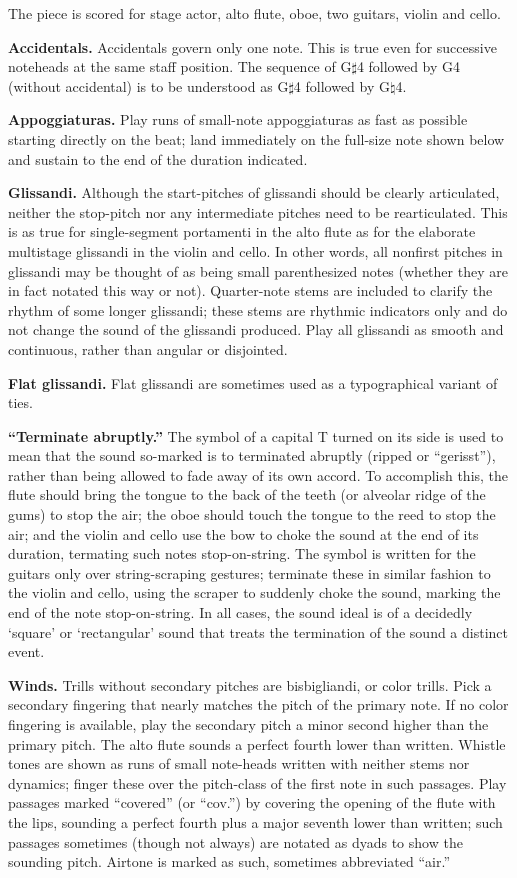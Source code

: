 The piece is scored for stage actor, alto flute, oboe, two guitars, violin and
cello.

\textbf{Accidentals.} Accidentals govern only one note. This is true even for
successive noteheads at the same staff position. The sequence of G$\sharp$4
followed by G4 (without accidental) is to be understood as G$\sharp$4 followed
by G$\natural$4.

\textbf{Appoggiaturas.} Play runs of small-note appoggiaturas as fast as
possible starting directly on the beat; land immediately on the full-size note
shown below and sustain to the end of the duration indicated.

\textbf{Glissandi.} Although the start-pitches of glissandi should be clearly
articulated, neither the stop-pitch nor any intermediate pitches need to be
rearticulated. This is as true for single-segment portamenti in the alto flute
as for the elaborate multistage glissandi in the violin and cello. In other
words, all nonfirst pitches in glissandi may be thought of as being small
parenthesized notes (whether they are in fact notated this way or not).
Quarter-note stems are included to clarify the rhythm of some longer glissandi;
these stems are rhythmic indicators only and do not change the sound of the
glissandi produced. Play all glissandi as smooth and continuous, rather than
angular or disjointed.

\textbf{Flat glissandi.} Flat glissandi are sometimes used as a typographical
variant of ties.

\textbf{``Terminate abruptly.''} The symbol of a capital T turned on its side
is used to mean that the sound so-marked is to terminated abruptly (ripped or
``gerisst''), rather than being allowed to fade away of its own accord. To
accomplish this, the flute should bring the tongue to the back of the teeth (or
alveolar ridge of the gums) to stop the air; the oboe should touch the tongue
to the reed to stop the air; and the violin and cello use the bow to choke the
sound at the end of its duration, termating such notes stop-on-string. The
symbol is written for the guitars only over string-scraping gestures; terminate
these in similar fashion to the violin and cello, using the scraper to suddenly
choke the sound, marking the end of the note stop-on-string. In all cases, the
sound ideal is of a decidedly `square' or `rectangular' sound that treats the
termination of the sound a distinct event.

\textbf{Winds.} Trills without secondary pitches are bisbigliandi, or color
trills. Pick a secondary fingering that nearly matches the pitch of the primary
note. If no color fingering is available, play the secondary pitch a minor
second higher than the primary pitch. The alto flute sounds a perfect fourth
lower than written. Whistle tones are shown as runs of small note-heads written
with neither stems nor dynamics; finger these over the pitch-class of the first
note in such passages. Play passages marked ``covered'' (or ``cov.'') by
covering the opening of the flute with the lips, sounding a perfect fourth plus
a major seventh lower than written; such passages sometimes (though not always)
are notated as dyads to show the sounding pitch. Airtone is marked as such,
sometimes abbreviated ``air.''

